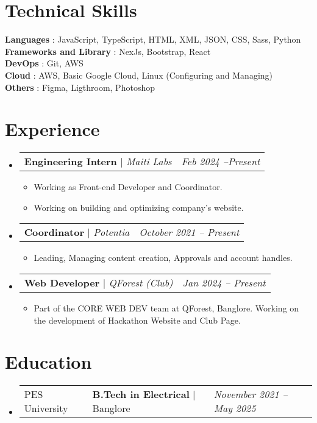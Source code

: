 \documentclass[letterpaper,10pt]{article}
\makeatletter
\newcommand{\sectionspace}{
\vspace{-20pt}
}
\newcommand{\subheadingtitlevspace}{
\vspace{-3pt}
}
\newcommand{\resumeItem}[1]{
  \item{
    {#1 \vspace{-4pt}}
  }
}
\newcommand{\titleItem}[1]{
  \textbf{#1}
}
\newcommand{\resumeSubheading}[4]{
  \item
     \begin{tabular*}{0.97\textwidth}[t]{l@{\extracolsep{\fill}}l@{}l}     
      {#1} & \titleItem{#3} | {#2} & \textit{#4}\\
    \end{tabular*}\vspace{-10pt}
}
\newcommand{\resumeProjectHeading}[2]{
    \item
    \begin{tabular*}{0.97\textwidth}{l@{\extracolsep{\fill}}r}
      #1 & \textit{ #2} \\
    \end{tabular*}\vspace{-9pt}
}
\newcommand{\resumeSubHeadingListStart}{\subheadingtitlevspace\begin{itemize}[leftmargin=0.15in, label={}]}
\newcommand{\resumeSubHeadingListEnd}{\end{itemize}}
\newcommand{\resumeItemListStart}{
\begin{itemize}}
\newcommand{\resumeItemListEnd}{
\end{itemize}\vspace{-8pt}}
\makeatother
\begin{document}
\section{Technical Skills}
\subheadingtitlevspace
 \begin{itemize}[leftmargin=0.15in, label={}]
    {\item{
     \titleItem{Languages}{: JavaScript, TypeScript, HTML, XML, JSON, CSS, Sass, Python} \\
     \titleItem{Frameworks and Library}{: NexJs, Bootstrap, React} \\
     \titleItem{DevOps}{: Git, AWS} \\
     \titleItem{Cloud}{: AWS, Basic Google Cloud, Linux (Configuring and Managing)} \\
     \titleItem{Others}{: Figma, Ligthroom, Photoshop}
    }}
 \end{itemize}
\sectionspace



    

\section{Experience}
  \resumeSubHeadingListStart
      \resumeProjectHeading
           {\titleItem{{Engineering Intern}} $|$ \emph{Maiti Labs}}{Feb 2024 --Present}
      \resumeItemListStart
        \resumeItem{Working as Front-end Developer and Coordinator.}
        \resumeItem{Working on building and optimizing company's website.}
      \resumeItemListEnd


    \resumeProjectHeading
           {\titleItem{{Coordinator}} $|$ \emph{Potentia}}{October 2021 -- Present}
      \resumeItemListStart
        \resumeItem{Leading, Managing content creation, Approvals and account handles.}
        \resumeItemListEnd
        
    \resumeProjectHeading
           {\titleItem{{Web Developer}} $|$ \emph{QForest (Club)}}{Jan 2024 -- Present}
      \resumeItemListStart    
    \resumeItem{Part of the CORE WEB DEV team at QForest, Banglore. Working on the development of Hackathon Website and Club Page.}
    \resumeItemListEnd
  \resumeSubHeadingListEnd



\section{Education}
  \resumeSubHeadingListStart
    \resumeSubheading
      {PES University}{Banglore}
      {B.Tech in Electrical}{November 2021 -- May 2025} 
  \resumeSubHeadingListEnd
\vspace{-8pt}
\end{document}
